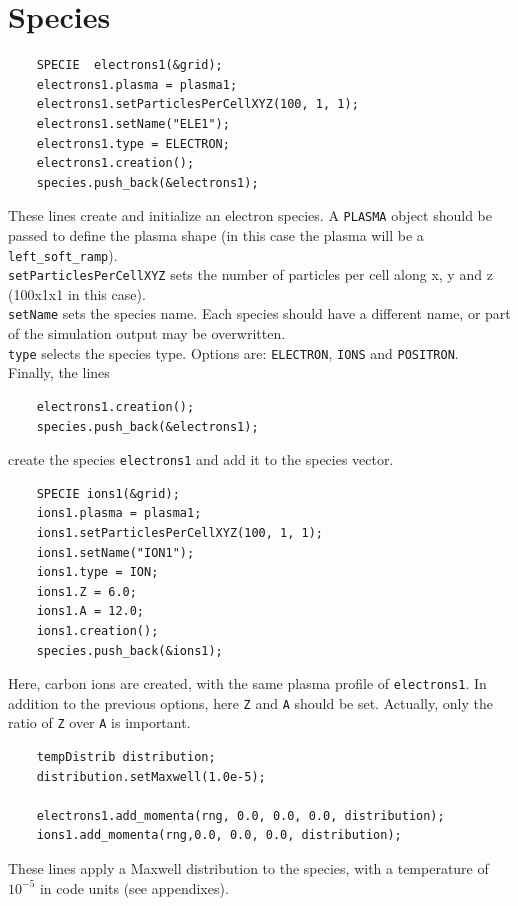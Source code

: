 \documentclass[11pt,a4paper]{report}
\begin{document}
\section{Species}\label{section_species}
\begin{lstlisting}
	SPECIE  electrons1(&grid);
	electrons1.plasma = plasma1;
	electrons1.setParticlesPerCellXYZ(100, 1, 1);       
	electrons1.setName("ELE1");
	electrons1.type = ELECTRON;
	electrons1.creation();                            
	species.push_back(&electrons1);
\end{lstlisting}
These lines create and initialize an electron species. A \verb+PLASMA+ object should be passed to define the plasma shape (in this case the plasma will be a \verb+left_soft_ramp+).\\
\verb+setParticlesPerCellXYZ+ sets the number of particles per cell along x, y and z (100x1x1 in this case).\\
\verb+setName+ sets the species name. Each species should have a different name, or part of the simulation output may be overwritten.\\
\verb+type+ selects the species type. Options are: \verb+ELECTRON+, \verb+IONS+ and \verb+POSITRON+. \\
Finally, the lines
\begin{lstlisting}
	electrons1.creation();                            
	species.push_back(&electrons1);
\end{lstlisting}
create the species \verb+electrons1+ and add it to the species vector. 
\begin{lstlisting}
	SPECIE ions1(&grid);
	ions1.plasma = plasma1;
	ions1.setParticlesPerCellXYZ(100, 1, 1);
	ions1.setName("ION1");
	ions1.type = ION;
	ions1.Z = 6.0;
	ions1.A = 12.0;
	ions1.creation();
	species.push_back(&ions1);
\end{lstlisting}  
Here, carbon ions are created, with the same plasma profile of \verb+electrons1+. In addition to the previous options, here \verb+Z+ and \verb+A+ should be set. Actually, only the ratio of \verb+Z+ over \verb+A+ is important.
\begin{lstlisting}
	tempDistrib distribution;
	distribution.setMaxwell(1.0e-5);

	electrons1.add_momenta(rng, 0.0, 0.0, 0.0, distribution);
	ions1.add_momenta(rng,0.0, 0.0, 0.0, distribution);
\end{lstlisting}
These lines apply a Maxwell distribution to the species, with a temperature of $10^{-5}$ in code units (see appendixes).\\
\end{document}

